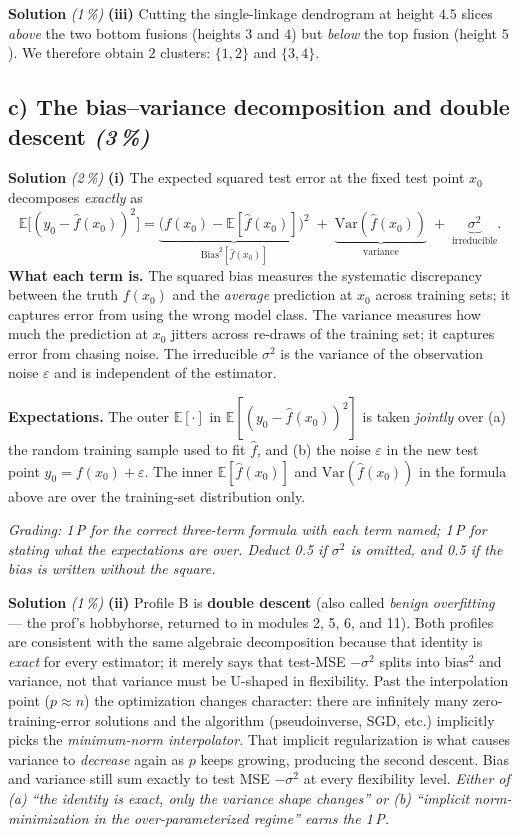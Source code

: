 \documentclass[11pt,a4paper]{article}
\newcommand{\subpoints}[1]{\textit{(#1\,\%)}}
\newcommand{\sol}{\noindent\textbf{Solution}}
\begin{document}
\medskip
\sol{} \subpoints{1} \textbf{(iii)} Cutting the single-linkage dendrogram at height $4.5$ slices
\emph{above} the two bottom fusions (heights $3$ and $4$) but \emph{below} the top fusion
(height $5$). We therefore obtain $\boxed{2}$ clusters: $\boxed{\{1,2\}}$ and $\boxed{\{3,4\}}$.

\subsection*{c) The bias--variance decomposition and double descent \subpoints{3}}

\sol{} \subpoints{2} \textbf{(i)} The expected squared test error at the fixed test point $x_0$
decomposes \emph{exactly} as
$$\mathbb{E}\bigl[(y_0-\hat f(x_0))^2\bigr]
   = \underbrace{\bigl(f(x_0)-\mathbb{E}[\hat f(x_0)]\bigr)^2}_{\mathrm{Bias}^2[\hat f(x_0)]}
   \;+\; \underbrace{\mathrm{Var}(\hat f(x_0))}_{\text{variance}}
   \;+\; \underbrace{\sigma^2}_{\text{irreducible}}.$$
\textbf{What each term is.} The squared bias measures the systematic discrepancy between the
truth $f(x_0)$ and the \emph{average} prediction at $x_0$ across training sets; it captures
error from using the wrong model class. The variance measures how much the prediction at $x_0$
jitters across re-draws of the training set; it captures error from chasing noise. The
irreducible $\sigma^2$ is the variance of the observation noise $\varepsilon$ and is independent
of the estimator.

\textbf{Expectations.} The outer $\mathbb{E}[\cdot]$ in $\mathbb{E}[(y_0-\hat f(x_0))^2]$ is
taken \emph{jointly} over (a) the random training sample used to fit $\hat f$, and (b) the noise
$\varepsilon$ in the new test point $y_0=f(x_0)+\varepsilon$. The inner $\mathbb{E}[\hat f(x_0)]$
and $\mathrm{Var}(\hat f(x_0))$ in the formula above are over the training-set distribution only.

\noindent\emph{Grading: 1\,P for the correct three-term formula with each term named; 1\,P for
stating what the expectations are over. Deduct 0.5 if $\sigma^2$ is omitted, and 0.5 if the
bias is written without the square.}

\medskip
\sol{} \subpoints{1} \textbf{(ii)} Profile B is \textbf{double descent} (also called
\emph{benign overfitting} --- the prof's hobbyhorse, returned to in modules 2, 5, 6, and 11).
Both profiles are consistent with the same algebraic decomposition because that identity is
\emph{exact} for every estimator; it merely says that test-MSE $-\sigma^2$ splits into bias$^2$
and variance, not that variance must be U-shaped in flexibility. Past the interpolation point
($p\approx n$) the optimization changes character: there are infinitely many zero-training-error
solutions and the algorithm (pseudoinverse, SGD, etc.) implicitly picks the
\emph{minimum-norm interpolator}. That implicit regularization is what causes variance to
\emph{decrease} again as $p$ keeps growing, producing the second descent. Bias and variance still
sum exactly to test MSE $-\sigma^2$ at every flexibility level. \emph{Either of (a) ``the
identity is exact, only the variance shape changes'' or (b) ``implicit norm-minimization in the
over-parameterized regime'' earns the 1\,P.}
\end{document}
